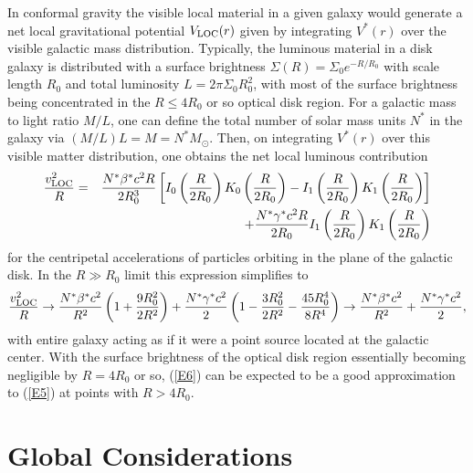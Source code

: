 \documentclass[preprint,aps]{revtex4}
\begin{document}
In conformal gravity the visible local material in a given galaxy would generate a net local gravitational potential $V_{\rm  LOC}(r)$ given by integrating $V^{*}(r)$ over the visible galactic mass distribution. Typically, the luminous material in a disk galaxy is distributed with a surface brightness $\Sigma (R)=\Sigma_0e^{-R/R_0}$ with scale length $R_0$ and total luminosity $L=2\pi \Sigma_0R_0^2$, with most of the surface brightness being concentrated in the $R \leq 4R_0$ or so optical disk region. For a galactic mass to light ratio $M/L$, one can define the total number of solar mass units $N^{*}$ in the galaxy via $(M/L)L=M=N^{*}M_{\odot}$. Then, on integrating $V^{*}(r)$ over this visible matter distribution, one obtains  \cite{Mannheim2006} the net local luminous contribution 
% 
\begin{eqnarray}
\frac{v_{{\rm LOC}}^2}{R}&=&
\frac{N^*\beta^*c^2 R}{2R_0^3}\left[I_0\left(\frac{R}{2R_0}
\right)K_0\left(\frac{R}{2R_0}\right)-
I_1\left(\frac{R}{2R_0}\right)
K_1\left(\frac{R}{2R_0}\right)\right]
\nonumber \\
&&+\frac{N^*\gamma^* c^2R}{2R_0}I_1\left(\frac{R}{2R_0}\right)
K_1\left(\frac{R}{2R_0}\right)
\label{E5}
\end{eqnarray} 
%
for the centripetal accelerations  of particles orbiting in the plane of the galactic disk.
In the $R\gg R_0$ limit this expression simplifies to 
% 
\begin{equation}
\frac{v_{{\rm LOC}}^2}{R} \rightarrow \frac{N^*\beta^*c^2}{R^2}\left(1+\frac{9R_0^2}{2R^2}\right)
+\frac{N^*\gamma^*c^2}{2}\left(1-\frac{3R_0^2}{2R^2}-\frac{45R_0^4}{8R^4}\right)
 \rightarrow \frac{N^*\beta^*c^2}{R^2}+
\frac{N^*\gamma^*c^2}{2},
\label{E6}
\end{equation} 
%
with entire galaxy acting as if it were a point source located at the galactic center. With the surface brightness of the optical disk region essentially becoming negligible by $R=4R_0$ or so, (\ref{E6}) can be expected to be a good approximation to (\ref{E5}) at points with $R > 4R_0$. 

\section{Global Considerations}
\label{s3}
\end{document}
